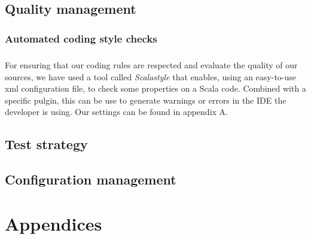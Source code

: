 \documentclass{report}
\begin{document}
\section{Quality management}

\subsection{Automated coding style checks}

\paragraph{}
\hspace{4mm}\textnormal{For ensuring that our coding rules are respected and evaluate the quality of our sources, we have
used a tool called \textit{Scalastyle} that enables, using an easy-to-use xml configuration file, to check
some properties on a Scala code. Combined with a specific pulgin, this can be use to generate warnings or errors
in the IDE the developer is using. Our settings can be found in appendix A.}

\section{Test strategy}

\paragraph{}
\hspace{4mm}\textnormal{}

\section{Configuration management}

\paragraph{}
\hspace{4mm}\textnormal{}

\chapter{Appendices}
\end{document}
